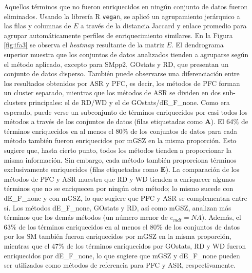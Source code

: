 \documentclass[12pt,twoside]{reedthesis}
\begin{document}
Aquellos términos que no fueron enriquecidos en ningún conjunto de datos fueron eliminados. Usando la librería R \texttt{vegan}, se aplicó un agrupamiento jerárquico a las filas y columnas de \(E\) a través de la distancia Jaccard y enlace promedio para agrupar automáticamente perfiles de enriquecimiento similares. En la Figura \ref{fig:ifa3} se observa el \emph{heatmap} resultante de la matriz \(E\). El dendrograma superior muestra que los conjuntos de datos analizados tienden a agruparse según el método aplicado, excepto para SMpp2, GOstats y RD, que presentan un conjunto de datos disperso. También puede observarse una diferenciación entre los resultados obtenidos por ASR y PFC, es decir, los métodos de PFC forman un cluster separado, mientras que los métodos de ASR se dividen en dos sub-clusters principales: el de RD/WD y el de GOstats/dE\_F\_none. Como era esperado, puede verse un subconjunto de términos enriquecidos por casi todos los métodos a través de los conjuntos de datos (filas etiquetadas como \textbf{A}). El 64\% de términos enriquecidos en al menos el 80\% de los conjuntos de datos para cada método también fueron enriquecidos por mGSZ en la misma proporción. Esto sugiere que, hasta cierto punto, todos los métodos tienden a proporcionar la misma información. Sin embargo, cada método también proporciona términos exclusivamente enriquecidos (filas etiquetadas como \textbf{E}). La comparación de los métodos de PFC y ASR muestra que RD y WD tienden a enriquecer algunos términos que no se enriquecen por ningún otro método; lo mismo sucede con dE\_F\_none y con mGSZ, lo que sugiere que PFC y ASR se complementan entre sí. Los métodos dE\_F\_none, GOstats y RD, así como mGSZ, analizan más términos que los demás métodos (un número menor de \(e_{mdt}=NA\)). Además, el 63\% de los términos enriquecidos en al menos el 80\% de los conjuntos de datos por los SM también fueron enriquecidos por mGSZ en la misma proporción, mientras que el 47\% de los términos enriquecidos por GOstats, RD y WD fueron enriquecidos por dE\_F\_none, lo que sugiere que mGSZ y dE\_F\_none pueden ser utilizados como métodos de referencia para PFC y ASR, respectivamente.

\par
\end{document}
